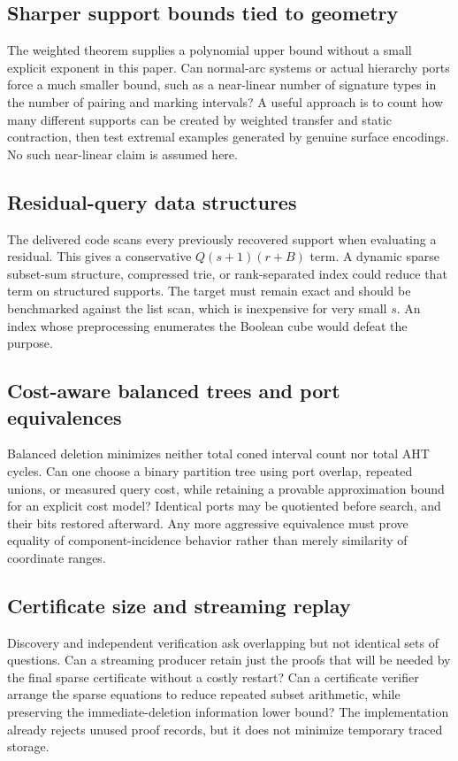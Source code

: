 \documentclass[11pt,letterpaper]{article}
\begin{document}
\subsection{Sharper support bounds tied to geometry}
The weighted theorem supplies a polynomial upper bound without a small
explicit exponent in this paper. Can normal-arc systems or actual hierarchy
ports force a much smaller bound, such as a near-linear number of signature
types in the number of pairing and marking intervals? A useful approach is to
count how many different supports can be created by weighted transfer and
static contraction, then test extremal examples generated by genuine surface
encodings. No such near-linear claim is assumed here.

\subsection{Residual-query data structures}
The delivered code scans every previously recovered support when evaluating
a residual. This gives a conservative $Q(s+1)(r+B)$ term. A dynamic sparse
subset-sum structure, compressed trie, or rank-separated index could reduce
that term on structured supports. The target must remain exact and should
be benchmarked against the list scan, which is inexpensive for very small
$s$. An index whose preprocessing enumerates the Boolean cube would defeat
the purpose.

\subsection{Cost-aware balanced trees and port equivalences}
Balanced deletion minimizes neither total coned interval count nor total AHT
cycles. Can one choose a binary partition tree using port overlap, repeated
unions, or measured query cost, while retaining a provable approximation
bound for an explicit cost model? Identical ports may be quotiented before
search, and their bits restored afterward. Any more aggressive equivalence
must prove equality of component-incidence behavior rather than merely
similarity of coordinate ranges.

\subsection{Certificate size and streaming replay}
Discovery and independent verification ask overlapping but not identical
sets of questions. Can a streaming producer retain just the proofs that will
be needed by the final sparse certificate without a costly restart? Can a
certificate verifier arrange the sparse equations to reduce repeated subset
arithmetic, while preserving the immediate-deletion information lower bound?
The implementation already rejects unused proof records, but it does not
minimize temporary traced storage.
\end{document}

